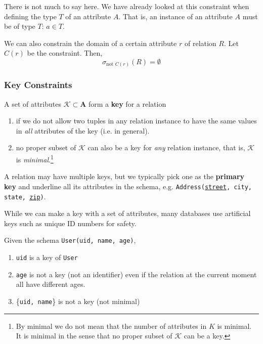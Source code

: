    There is not much to say here. We have already looked at this constraint when defining the type $T$ of an attribute $A$. That is, an instance of an attribute $A$ must be of type $T$: $a \in T$. 

    \begin{definition}
      \label{def:domain-constraints}
      We can also constrain the domain of a certain attribute $r$ of relation $R$. Let $C(r)$ be the constraint. Then, 
      \begin{equation}
        \sigma_{\text{not } C(r)} (R) = \emptyset
      \end{equation}
    \end{definition}

  \subsubsection{Key Constraints}

    \begin{definition}[Key]
      \label{def:key}
      A set of attributes $\mathcal{K} \subset \mathbf{A}$ form a \textbf{key} for a relation 
      \begin{enumerate}
        \item if we do not allow two tuples in any relation instance to have the same values in \textit{all} attributes of the key (i.e. in general). 
        \item no proper subset of $\mathcal{K}$ can also be a key for \textit{any} relation instance, that is, $\mathcal{K}$ is \textit{minimal}.\footnote{By minimal we do not mean that the number of attributes in $K$ is minimal. It is minimal in the sense that no proper subset of $\mathcal{K}$ can be a key.}
      \end{enumerate}
      A relation may have multiple keys, but we typically pick one as the \textbf{primary key} and underline all its attributes in the schema, e.g. \texttt{Address(\underline{street}, city, state, \underline{zip})}. 
    \end{definition}

    While we can make a key with a set of attributes, many databases use artificial keys such as unique ID numbers for safety. 

    \begin{example}
      \label{ex:keys-of-user-relation}
      Given the schema \texttt{User(uid, name, age)}, 
      \begin{enumerate}
        \item \texttt{uid} is a key of \texttt{User} 
        \item \texttt{age} is not a key (not an identifier) even if the relation at the current moment all have different ages. 
        \item \{\texttt{uid, name}\} is not a key (not minimal)
      \end{enumerate}
    \end{example}

